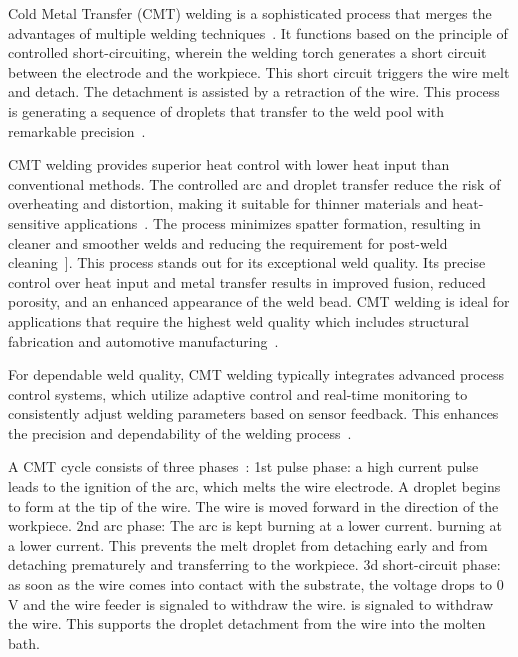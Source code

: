 Cold Metal Transfer (CMT) welding is a sophisticated process that merges the advantages of multiple welding techniques~\cite{Dutra.2015}. It functions based on the principle of controlled short-circuiting, wherein the welding torch generates a short circuit between the electrode and the workpiece. This short circuit triggers the wire melt and detach. The detachment is assisted by a retraction of the wire. This process is generating a sequence of droplets that transfer to the weld pool with remarkable precision~\cite{Selvi.2018, Srinivasan.2022}.

CMT welding provides superior heat control with lower heat input than conventional methods. The controlled arc and droplet transfer reduce the risk of overheating and distortion, making it suitable for thinner materials and heat-sensitive applications~\cite{Scotti.2020}. The process minimizes spatter formation, resulting in cleaner and smoother welds and reducing the requirement for post-weld cleaning~\cite{Srinivasan.2022}]. This process stands out for its exceptional weld quality. Its precise control over heat input and metal transfer results in improved fusion, reduced porosity, and an enhanced appearance of the weld bead. CMT welding is ideal for applications that require the highest weld quality which includes structural fabrication and automotive manufacturing~\cite{Cong.2016}.

For dependable weld quality, CMT welding typically integrates advanced process control systems, which utilize adaptive control and real-time monitoring to consistently adjust welding parameters based on sensor feedback. This enhances the precision and dependability of the welding process~\cite{Pickin.2006}.

A CMT cycle consists of three phases~\cite{Selvi.2018}:\newline
1st pulse phase: a high current pulse leads to the ignition of the arc, 
which melts the wire electrode. A droplet begins to form at the 
tip of the wire. The wire is moved forward in the direction of the 
workpiece.\newline
2nd arc phase: The arc is kept burning at a lower current. 
burning at a lower current. This prevents the melt droplet from detaching early and 
from detaching prematurely and transferring to the workpiece.\newline
3d short-circuit phase: as soon as the wire comes into contact with the substrate, 
the voltage drops to 0 V and the wire feeder is signaled to withdraw the wire. 
is signaled to withdraw the wire. This supports the droplet detachment 
from the wire into the molten bath.

